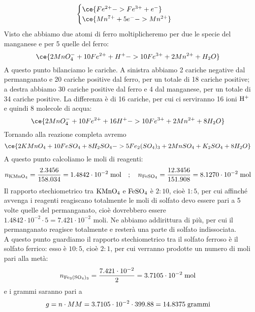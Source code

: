 \begin{soluzione}
\begin{equation*}
\begin{cases}
            \ce{Fe^{2+} -> Fe^{3+} + e^-}\\
            \ce{Mn^{7+} + 5e^- -> Mn^{2+}}
        \end{cases}
    \end{equation*}
    Visto che abbiamo due atomi di ferro moltiplicheremo per due le specie del manganese e per 5 quelle del ferro:
    \begin{equation*}
        \ce{2MnO_4^- + 10Fe^{2+} + H^+ -> 10Fe^{3+} + 2Mn^{2+} + H_2O}
    \end{equation*}
    A questo punto bilanciamo le cariche. A sinistra abbiamo 2 cariche negative dal permanganato e 20 cariche positive dal ferro, per un totale di 18 cariche positive; a destra abbiamo 30 cariche positive dal ferro e 4 dal manganese, per un totale di 34 cariche positive. La differenza è di 16 cariche, per cui ci serviranno 16 ioni $\rm H^+$ e quindi 8 molecole di acqua:
    \begin{equation*}
        \ce{2MnO_4^- + 10Fe^{2+} + 16H^+ -> 10Fe^{3+} + 2Mn^{2+} + 8H_2O}
    \end{equation*}
    Tornando alla reazione completa avremo
    \begin{equation*}
        \ce{2KMnO_4 + 10FeSO_4 + 8H_2SO_4 -> 5Fe_2(SO_4)_3 + 2MnSO_4 + K_2SO_4 + 8H_2O}
    \end{equation*}
    A questo punto calcoliamo le moli di reagenti:
    \begin{equation*}
        n_{\rm KMnO_4}=\frac{2.3456}{158.034}
        =1.4842 \cdot 10^{-2} \; \text{mol}
        \quad;\quad
        n_{\rm FeSO_4}=\frac{12.3456}{151.908}
        =8.1270 \cdot 10^{-2} \; \rm mol
    \end{equation*}
    Il rapporto stechiometrico tra $\rm KMnO_4$ e $\rm FeSO_4$ è $2:10$, cioè $1:5$, per cui affinché avvenga i reagenti reagiscano totalmente le moli di solfato devo essere pari a 5 volte quelle del permanganato, cioè dovrebbero essere $1.4842 \cdot 10^{-2} \cdot 5=7.421 \cdot 10^{-2}$ moli. Ne abbiamo addirittura di più, per cui il permanganato reagisce totalmente e resterà una parte di solfato indissociata.\\
    A questo punto guardiamo il rapporto stechiometrico tra il solfato ferroso è il solfato ferrico: esso è $10:5$, cioè $2:1$, per cui verranno prodotte un numero di moli pari alla metà:
    \begin{equation*}
        n_{\rm Fe_3(SO_4)_3}=\frac{7.421 \cdot 10^{-2}}{2}=3.7105 \cdot 10^{-2} \; \rm mol
    \end{equation*}
    e i grammi saranno pari a
    \begin{equation*}
        g=n \cdot MM=3.7105 \cdot 10^{-2} \cdot 399.88=14.8375 \; \rm grammi
    \end{equation*}
\end{soluzione}

